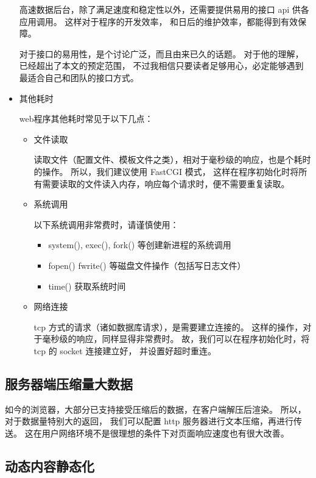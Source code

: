 \documentclass{article}
\begin{document}
\begin{itemize}
    高速数据后台，除了满足速度和稳定性以外，还需要提供易用的接口 api 供各应用调用。 这样对于程序的开发效率，
    和日后的维护效率，都能得到有效保障。

    对于接口的易用性，是个讨论广泛，而且由来已久的话题。 对于他的理解，已经超出了本文的预定范围，
    不过我相信只要读者足够用心，必定能够遇到最适合自己和团队的接口方式。

  \item 其他耗时

    web程序其他耗时常见于以下几点：

    \begin{itemize}
    \item 文件读取

      读取文件（配置文件、模板文件之类），相对于毫秒级的响应，也是个耗时的操作。 所以，我们建议使用 FastCGI 模式，
      这样在程序初始化时将所有需要读取的文件读入内存，响应每个请求时，便不需要重复读取。

    \item 系统调用

      以下系统调用非常费时，请谨慎使用：

      \begin{itemize}
      \item system(), exec(), fork() 等创建新进程的系统调用
      \item fopen() fwrite() 等磁盘文件操作（包括写日志文件）
      \item time() 获取系统时间
      \end{itemize}
      
    \item 网络连接

      tcp 方式的请求（诸如数据库请求），是需要建立连接的。 这样的操作，对于毫秒级的响应，同样显得非常费时。
      故，我们可以在程序初始化时，将 tcp 的 socket 连接建立好， 并设置好超时重连。
    \end{itemize}
  \end{itemize}

  \subsection{服务器端压缩量大数据}

  如今的浏览器，大部分已支持接受压缩后的数据，在客户端解压后渲染。  所以，对于数据量特别大的返回，
  我们可以配置 http 服务器进行文本压缩，再进行传送。 这在用户网络环境不是很理想的条件下对页面响应速度也有很大改善。
  
  \subsection{动态内容静态化}
  
\end{document}
